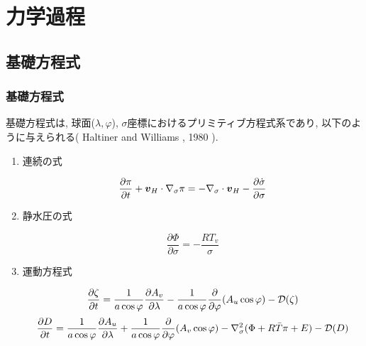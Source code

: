 ﻿
\section{力学過程}

\subsection{基礎方程式}

\subsubsection{基礎方程式}

基礎方程式は,
球面($\lambda,\varphi$), $\sigma$座標におけるプリミティブ方程式系であり,
以下のように与えられる( Haltiner and Williams , 1980 ).


\begin{enumerate}
\item 連続の式

\begin{equation}
  \label{質量}
  \frac{\partial \pi}{\partial t} 
    + \Dvect{v}_{H} \cdot \nabla_{\sigma} \pi
     =  - \nabla_{\sigma} \cdot \Dvect{v}_{H} 
          - \frac{\partial \dot{\sigma}}{\partial \sigma}
\end{equation}

\item 静水圧の式

\begin{equation}
\label{静水圧}
  \frac{\partial \Phi}{\partial \sigma} = - \frac{RT_v}{\sigma} 
\end{equation}


\item 運動方程式

\begin{equation}
  \label{渦度}
  \frac{\partial \zeta}{\partial t} 
     =   \frac{1}{a\cos\varphi}
            \frac{\partial A_v}{\partial \lambda}
          - \frac{1}{a\cos \varphi}
            \frac{\partial}{\partial \varphi} ( A_u \cos\varphi )
          - {\cal D}(\zeta) 
\end{equation}
\begin{equation}
  \label{発散}
  \frac{\partial D}{\partial t} 
     =    \frac{1}{a\cos\varphi}
            \frac{\partial A_u}{\partial \lambda}
          + \frac{1}{a\cos\varphi}
            \frac{\partial }{\partial \varphi} ( A_v \cos\varphi )
          - \nabla^{2}_{\sigma}
           ( \Phi + R \bar{T} \pi + E ) 
          - {\cal D}(D) 
\end{equation}



\end{enumerate}

